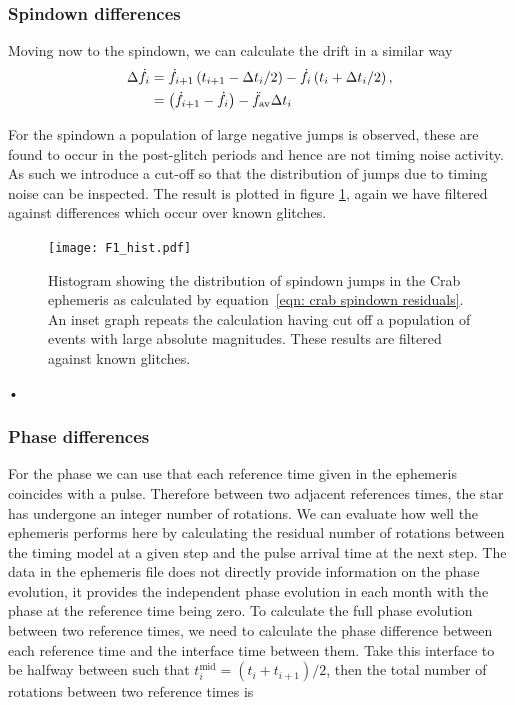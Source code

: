 \documentclass[../full_thesis/full_thesis.tex]{subfiles}
\begin{document}
\subsubsection{Spindown differences}
Moving now to the spindown, we can calculate the drift in a similar way
\begin{align}
\Delta\dot{f}_{i} & = \dot{f}_{i+1}\left(t_{i+1}-\Delta t_{i}/2\right) -  \dot{f}_{i}\left(t_{i}+\Delta t_{i}/2\right), \\
& = \left(\dot{f}_{i+1}-\dot{f}_{i}\right) -  \ddot{f}_{\textrm{av}} \Delta t_{i}
\label{eqn: crab spindown residuals}
\end{align}

For the spindown a population of large negative jumps is observed, these are
found to occur in the post-glitch periods and hence are not timing noise
activity.  As such we introduce a cut-off so that the distribution of jumps due
to timing noise can be inspected. The result is plotted in figure \ref{fig: F1_hist},
again we have filtered against differences which occur over known glitches.

\begin{figure}[ht]
\centering
\texttt{[image: F1\_hist.pdf]}
\caption{Histogram showing the distribution of spindown jumps in the Crab ephemeris as 
 calculated by equation~\eqref{eqn: crab spindown residuals}. An inset graph
 repeats the calculation having cut off a population of events with large
 absolute magnitudes. These results are filtered against known glitches.}
\label{fig: F1_hist}
\end{figure}•

\FloatBarrier
\subsubsection{Phase differences}
\newcommand{\tmid}{t^{\textrm{mid}}_{i}}

For the phase we can use that each reference time given in the ephemeris coincides
with a pulse. Therefore between two adjacent references times, the star has 
undergone an integer number of rotations. We can evaluate how well the ephemeris
performs here by calculating the residual number of
rotations between the timing model at a given step and the pulse arrival time at the next
step. The data in the ephemeris file does not directly provide
information on the phase evolution, it provides the independent phase evolution
in each month with the phase at the reference time being zero. To calculate the
full phase evolution between two reference times, we need to calculate the
phase difference between each reference time and the interface time between
them. Take this interface to be halfway between such that $\tmid=(t_{i} +
t_{i+1})/2$, then the total number of rotations between two reference times is
\end{document}
